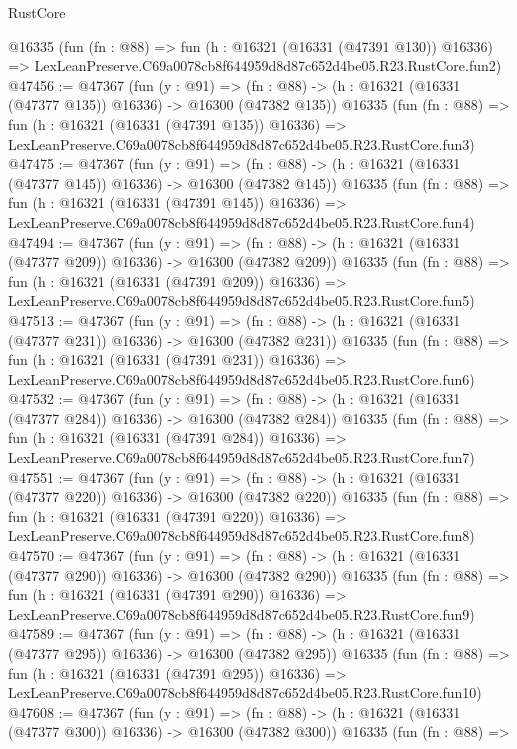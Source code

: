 \begin{lexlean}{RustCore}
\begin{coremodule}
    @16335
    (fun (fn : @88) =>
    fun (h : @16321 (@16331 (@47391 @130)) @16336) =>
    LexLeanPreserve.C69a0078cb8f644959d8d87c652d4be05.R23.RustCore.fun2)
@47456 := @47367
    (fun (y : @91) =>
    (fn : @88) -> (h : @16321 (@16331 (@47377 @135)) @16336) -> @16300 (@47382 @135))
    @16335
    (fun (fn : @88) =>
    fun (h : @16321 (@16331 (@47391 @135)) @16336) =>
    LexLeanPreserve.C69a0078cb8f644959d8d87c652d4be05.R23.RustCore.fun3)
@47475 := @47367
    (fun (y : @91) =>
    (fn : @88) -> (h : @16321 (@16331 (@47377 @145)) @16336) -> @16300 (@47382 @145))
    @16335
    (fun (fn : @88) =>
    fun (h : @16321 (@16331 (@47391 @145)) @16336) =>
    LexLeanPreserve.C69a0078cb8f644959d8d87c652d4be05.R23.RustCore.fun4)
@47494 := @47367
    (fun (y : @91) =>
    (fn : @88) -> (h : @16321 (@16331 (@47377 @209)) @16336) -> @16300 (@47382 @209))
    @16335
    (fun (fn : @88) =>
    fun (h : @16321 (@16331 (@47391 @209)) @16336) =>
    LexLeanPreserve.C69a0078cb8f644959d8d87c652d4be05.R23.RustCore.fun5)
@47513 := @47367
    (fun (y : @91) =>
    (fn : @88) -> (h : @16321 (@16331 (@47377 @231)) @16336) -> @16300 (@47382 @231))
    @16335
    (fun (fn : @88) =>
    fun (h : @16321 (@16331 (@47391 @231)) @16336) =>
    LexLeanPreserve.C69a0078cb8f644959d8d87c652d4be05.R23.RustCore.fun6)
@47532 := @47367
    (fun (y : @91) =>
    (fn : @88) -> (h : @16321 (@16331 (@47377 @284)) @16336) -> @16300 (@47382 @284))
    @16335
    (fun (fn : @88) =>
    fun (h : @16321 (@16331 (@47391 @284)) @16336) =>
    LexLeanPreserve.C69a0078cb8f644959d8d87c652d4be05.R23.RustCore.fun7)
@47551 := @47367
    (fun (y : @91) =>
    (fn : @88) -> (h : @16321 (@16331 (@47377 @220)) @16336) -> @16300 (@47382 @220))
    @16335
    (fun (fn : @88) =>
    fun (h : @16321 (@16331 (@47391 @220)) @16336) =>
    LexLeanPreserve.C69a0078cb8f644959d8d87c652d4be05.R23.RustCore.fun8)
@47570 := @47367
    (fun (y : @91) =>
    (fn : @88) -> (h : @16321 (@16331 (@47377 @290)) @16336) -> @16300 (@47382 @290))
    @16335
    (fun (fn : @88) =>
    fun (h : @16321 (@16331 (@47391 @290)) @16336) =>
    LexLeanPreserve.C69a0078cb8f644959d8d87c652d4be05.R23.RustCore.fun9)
@47589 := @47367
    (fun (y : @91) =>
    (fn : @88) -> (h : @16321 (@16331 (@47377 @295)) @16336) -> @16300 (@47382 @295))
    @16335
    (fun (fn : @88) =>
    fun (h : @16321 (@16331 (@47391 @295)) @16336) =>
    LexLeanPreserve.C69a0078cb8f644959d8d87c652d4be05.R23.RustCore.fun10)
@47608 := @47367
    (fun (y : @91) =>
    (fn : @88) -> (h : @16321 (@16331 (@47377 @300)) @16336) -> @16300 (@47382 @300))
    @16335
    (fun (fn : @88) =>

\end{coremodule}
\end{lexlean}
